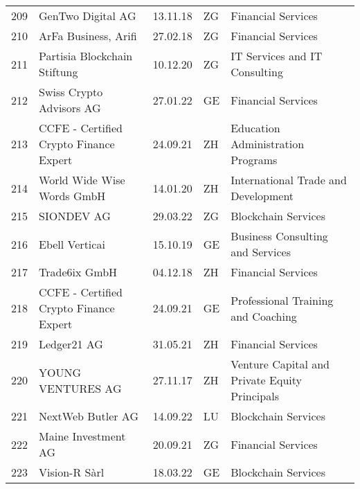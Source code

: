 \begin{tabular}{lllll}
209 &                                  GenTwo Digital AG &      13.11.18 &     ZG &                             Financial Services \\
210 &                               ArFa Business, Arifi &      27.02.18 &     ZG &                             Financial Services \\
211 &                       Partisia Blockchain Stiftung &      10.12.20 &     ZG &                  IT Services and IT Consulting \\
212 &                           Swiss Crypto Advisors AG &      27.01.22 &     GE &                             Financial Services \\
213 &             CCFE - Certified Crypto Finance Expert &      24.09.21 &     ZH &              Education Administration Programs \\
214 &                         World Wide Wise Words GmbH &      14.01.20 &     ZH &            International Trade and Development \\
215 &                                         SIONDEV AG &      29.03.22 &     ZG &                            Blockchain Services \\
216 &                                     Ebell Verticai &      15.10.19 &     GE &               Business Consulting and Services \\
217 &                                      Trade6ix GmbH &      04.12.18 &     ZH &                             Financial Services \\
218 &             CCFE - Certified Crypto Finance Expert &      24.09.21 &     GE &             Professional Training and Coaching \\
219 &                                        Ledger21 AG &      31.05.21 &     ZH &                             Financial Services \\
220 &                                  YOUNG VENTURES AG &      27.11.17 &     ZH &  Venture Capital and Private Equity Principals \\
221 &                                  NextWeb Butler AG &      14.09.22 &     LU &                            Blockchain Services \\
222 &                                Maine Investment AG &      20.09.21 &     ZG &                             Financial Services \\
223 &                                      Vision-R Sàrl &      18.03.22 &     GE &                            Blockchain Services \\

\end{tabular}
